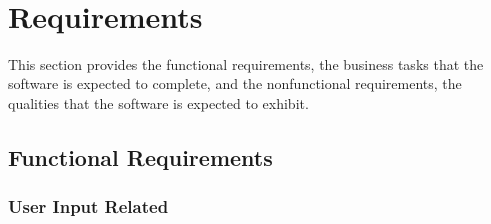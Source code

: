 \documentclass[12pt]{article}
\begin{document}
~\newpage
\section{Requirements}

This section provides the functional requirements, the business tasks that the software is expected to complete, and the nonfunctional requirements, the qualities that the software is expected to exhibit.

\subsection{Functional Requirements}

\subsubsection{User Input Related}
\end{document}
